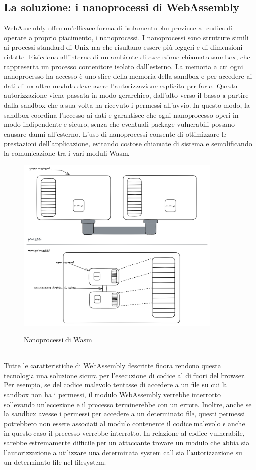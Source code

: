\subsection{La soluzione: i nanoprocessi di WebAssembly}
WebAssembly offre un'efficace forma di isolamento che previene al codice di operare a proprio piacimento, i
nanoprocessi\cite{wasm-nano-processes}. I nanoprocessi sono strutture simili ai processi standard di Unix ma che
risultano essere più leggeri e di dimensioni ridotte. Risiedono all'interno di un ambiente di esecuzione chiamato
sandbox, che rappresenta un processo contenitore isolato dall'esterno. La memoria a cui ogni nanoprocesso ha accesso è
uno slice della memoria della  sandbox e per accedere ai dati di un altro modulo deve avere l'autorizzazione esplicita
per farlo. Questa autorizzazione viene passata in modo gerarchico, dall'alto verso il basso a partire dalla sandbox che
a sua volta ha ricevuto i permessi all'avvio. In questo modo, la sandbox coordina l'accesso ai dati e garantisce che
ogni nanoprocesso operi in modo indipendente e sicuro, senza che eventuali package vulnerabili possano causare danni
all'esterno. L'uso di nanoprocessi consente di ottimizzare le prestazioni dell'applicazione, evitando costose chiamate
di sistema e semplificando la comunicazione tra i vari moduli Wasm.
\begin{figure}[h]
    \centering
    \captionsetup{justification=centering}
    \includegraphics[width=10cm]{./chapters/2.wasi-in-depth/images/4.nanoprocesses.png}
    \label{nanoprocesses}
    \caption{Nanoprocessi di Wasm}
\end{figure}
\\
Tutte le caratteristiche di WebAssembly descritte finora rendono questa tecnologia una soluzione sicura per l'esecuzione
di codice al di fuori del browser. Per esempio, se del codice malevolo tentasse di accedere a un file su cui la sandbox
non ha i permessi, il modulo WebAssembly verrebbe interrotto sollevando un'eccezione e il processo terminerebbe con un
errore. Inoltre, anche se la sandbox avesse i permessi per accedere a un determinato file, questi permessi potrebbero
non essere associati al modulo contenente il codice malevolo e anche in questo caso il processo verrebbe interrotto. In
relazione al codice vulnerabile, sarebbe estremamente difficile per un attaccante trovare un modulo che abbia sia
l'autorizzazione a utilizzare una determinata system call sia l'autorizzazione su un determinato file nel filesystem.

